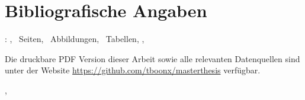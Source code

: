 
\chapter*{Bibliografische Angaben}
\label{sec:Referat}

\autor : \titel  , \pageref*{LastPage}~Seiten, \totalfigures ~Abbildungen, \totaltables ~Tabellen, \hochschule , \fachbereich

Die druckbare PDF Version dieser Arbeit sowie alle relevanten Datenquellen sind unter der Website \url{https://github.com/tboonx/masterthesis} verfügbar.

\arbeit , \the\year

\Satz